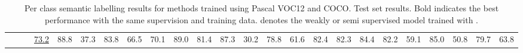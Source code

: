\documentclass[10pt,english,british,twocolumn]{article}
\providecommand{\tabularnewline}{\\}
\begin{document}
\begin{landscape}{\scriptsize{}}
\begin{table}[t]
\begin{centering}
\begin{tabular}{c|c|c|c|c|c|c|c|c|c|c|c|c|c|c|c|c|c|c|c|c|c|c|c}
 &  & {\scriptsize{}\hspace{-0.6em}\hspace*{0.1em}\cite{Chen2015Iclr}\hspace{-0.6em}} & {\scriptsize{}\uline{73.2}} & {\scriptsize{}88.8} & {\scriptsize{}37.3} & {\scriptsize{}83.8} & {\scriptsize{}66.5} & {\scriptsize{}70.1} & {\scriptsize{}89.0} & {\scriptsize{}81.4} & {\scriptsize{}87.3} & {\scriptsize{}30.2} & {\scriptsize{}78.8} & {\scriptsize{}61.6} & {\scriptsize{}82.4} & {\scriptsize{}82.3} & {\scriptsize{}84.4} & {\scriptsize{}82.2} & {\scriptsize{}59.1} & {\scriptsize{}85.0} & {\scriptsize{}50.8} & {\scriptsize{}79.7} & {\scriptsize{}63.8}\tabularnewline
\end{tabular}\hspace*{\fill}{\scriptsize{}\vspace{0.5em}
}
\par\end{centering}{\scriptsize \par}
{\scriptsize{}\caption{\label{tab:Semantic-labelling-results-boxes-only}Per class semantic
labelling results for methods trained using Pascal VOC12 and COCO.
Test set results. Bold indicates the best performance with the same
supervision and training data.  denotes
the weakly or semi supervised model trained with .}
\vspace{-1.5em}
}{\scriptsize \par}
\end{table}
\end{landscape}

\captionsetup[subfigure]{labelformat=empty,font=scriptsize}
\end{document}
